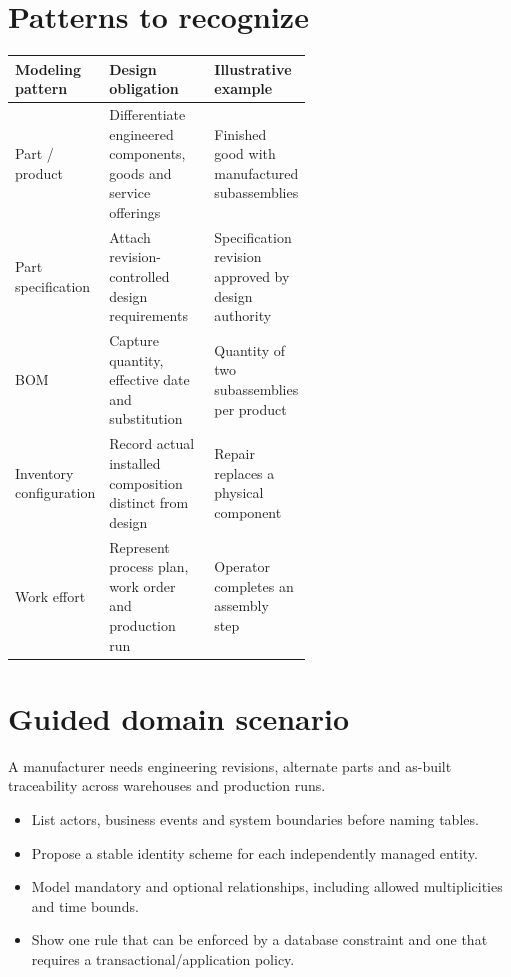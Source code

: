 \documentclass[11pt,letterpaper]{article}
\begin{document}
\section{Patterns to recognize}
\begin{tabularx}{\linewidth}{@{}>{\raggedright\arraybackslash}p{0.22\linewidth} >{\raggedright\arraybackslash}p{0.37\linewidth}>{\raggedright\arraybackslash}X@{}}
\toprule
\textbf{Modeling pattern} & \textbf{Design obligation} & \textbf{Illustrative example} \\ 
\midrule
Part / product & Differentiate engineered components, goods and service offerings & Finished good with manufactured subassemblies \\ 
Part specification & Attach revision-controlled design requirements & Specification revision approved by design authority \\ 
BOM & Capture quantity, effective date and substitution & Quantity of two subassemblies per product \\ 
Inventory configuration & Record actual installed composition distinct from design & Repair replaces a physical component \\ 
Work effort & Represent process plan, work order and production run & Operator completes an assembly step \\ 
\bottomrule
\end{tabularx}

\section{Guided domain scenario}
A manufacturer needs engineering revisions, alternate parts and as-built traceability across warehouses and production runs.

\begin{itemize}
\item List actors, business events and system boundaries before naming tables.
\item Propose a stable identity scheme for each independently managed entity.
\item Model mandatory and optional relationships, including allowed multiplicities and time bounds.
\item Show one rule that can be enforced by a database constraint and one that requires a transactional/application policy.
\end{itemize}
\end{document}
